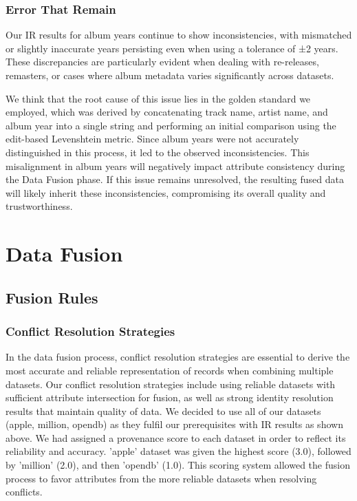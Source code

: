 \documentclass[runningheads]{llncs}
\begin{document}
\subsubsection{Error That Remain}

Our IR results for album years continue to show inconsistencies, with mismatched or slightly inaccurate years persisting even when using a tolerance of ±2 years. These discrepancies are particularly evident when dealing with re-releases, remasters, or cases where album metadata varies significantly across datasets.

We think that the root cause of this issue lies in the golden standard we employed, which was derived by concatenating track name, artist name, and album year into a single string and performing an initial comparison using the edit-based Levenshtein metric. Since album years were not accurately distinguished in this process, it led to the observed inconsistencies. This misalignment in album years will negatively impact attribute consistency during the Data Fusion phase. If this issue remains unresolved, the resulting fused data will likely inherit these inconsistencies, compromising its overall quality and trustworthiness.
\section{Data Fusion}
\subsection{Fusion Rules}
\subsubsection{Conflict Resolution Strategies}
In the data fusion process, conflict resolution strategies are essential to derive the most accurate and reliable representation of records when combining multiple datasets. Our conflict resolution strategies include
using reliable datasets with sufficient attribute intersection for fusion, as well as strong identity resolution results that maintain quality of data. We decided to use all of our datasets (apple, million, opendb) as
they fulfil our prerequisites with IR results as shown above. We had assigned a provenance score to each dataset in order to reflect its reliability and accuracy. 'apple' dataset was given the highest score (3.0), followed by 'million' (2.0), and then 'opendb' (1.0).
This scoring system allowed the fusion process to favor attributes from the more reliable datasets when resolving conflicts. 
\end{document}
